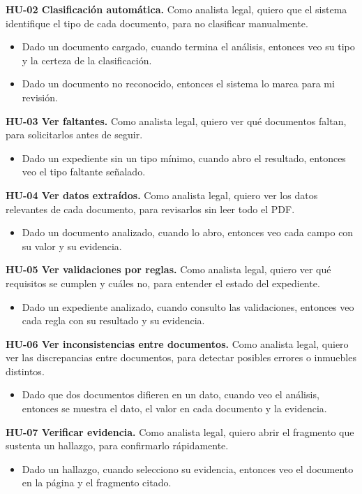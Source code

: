 \documentclass[11pt, a4paper]{article}
\begin{document}
\textbf{HU-02 Clasificación automática.} Como analista legal, quiero que el sistema identifique el tipo de cada documento, para no clasificar manualmente.
\begin{itemize}
    \item Dado un documento cargado, cuando termina el análisis, entonces veo su tipo y la certeza de la clasificación.
    \item Dado un documento no reconocido, entonces el sistema lo marca para mi revisión.
\end{itemize}

\textbf{HU-03 Ver faltantes.} Como analista legal, quiero ver qué documentos faltan, para solicitarlos antes de seguir.
\begin{itemize}
    \item Dado un expediente sin un tipo mínimo, cuando abro el resultado, entonces veo el tipo faltante señalado.
\end{itemize}

\textbf{HU-04 Ver datos extraídos.} Como analista legal, quiero ver los datos relevantes de cada documento, para revisarlos sin leer todo el PDF.
\begin{itemize}
    \item Dado un documento analizado, cuando lo abro, entonces veo cada campo con su valor y su evidencia.
\end{itemize}

\textbf{HU-05 Ver validaciones por reglas.} Como analista legal, quiero ver qué requisitos se cumplen y cuáles no, para entender el estado del expediente.
\begin{itemize}
    \item Dado un expediente analizado, cuando consulto las validaciones, entonces veo cada regla con su resultado y su evidencia.
\end{itemize}

\textbf{HU-06 Ver inconsistencias entre documentos.} Como analista legal, quiero ver las discrepancias entre documentos, para detectar posibles errores o inmuebles distintos.
\begin{itemize}
    \item Dado que dos documentos difieren en un dato, cuando veo el análisis, entonces se muestra el dato, el valor en cada documento y la evidencia.
\end{itemize}

\textbf{HU-07 Verificar evidencia.} Como analista legal, quiero abrir el fragmento que sustenta un hallazgo, para confirmarlo rápidamente.
\begin{itemize}
    \item Dado un hallazgo, cuando selecciono su evidencia, entonces veo el documento en la página y el fragmento citado.
\end{itemize}
\end{document}
